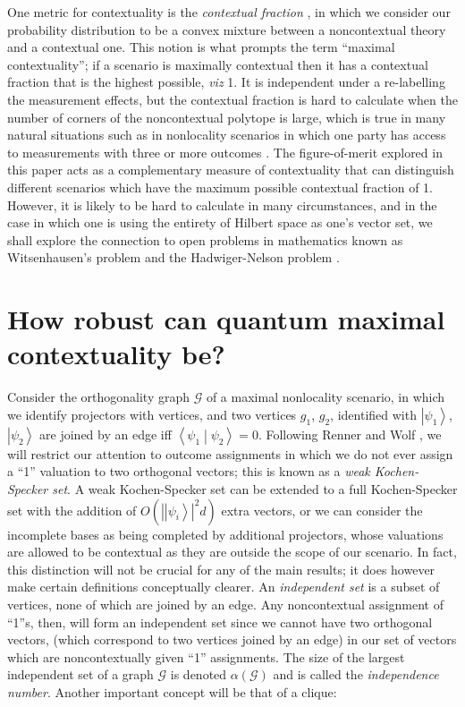 \documentclass{amsart}
\theoremstyle{definition}
\newcommand{\ket}[1]{{\left\vert{#1}\right\rangle}}
\newcommand{\braket}[2]{{\left< {#1} \middle\vert {#2}\right>}}
\begin{document}
One metric for contextuality is the \emph{contextual fraction} \cite{Abra2017}, in which we consider our probability distribution to be a convex mixture between a noncontextual theory and a contextual one. This notion is what prompts the term ``maximal contextuality''; if a scenario is maximally contextual then it has a contextual fraction that is the highest possible, \emph{viz} 1. It is independent under a  re-labelling the measurement effects, but the contextual fraction is hard to calculate when the number of corners of the noncontextual polytope is large, which is true in many natural situations such as in nonlocality scenarios in which one party has access to measurements with three or more outcomes \cite{SimmCC}. The figure-of-merit explored in this paper acts as a complementary measure of contextuality that can distinguish different scenarios which have the maximum possible contextual fraction of 1. However, it is likely to be hard to calculate in many circumstances, and in the case in which one is using the entirety of Hilbert space as one's vector set, we shall explore the connection to open problems in mathematics known as Witsenhausen's problem \cite{Wits1974} and the Hadwiger-Nelson problem \cite{Soif2008}.




\section{How robust can quantum maximal contextuality be?}\label{sec:main}

Consider the orthogonality graph $\mathcal{G}$ of a maximal nonlocality scenario, in which we identify projectors with vertices, and two vertices $g_1$, $g_2$, identified with $\ket{\psi_1}$, $\ket{\psi_2}$ are joined by an edge iff $\braket{\psi_1}{\psi_2}=0$. Following Renner and Wolf \cite{Renn2004}, we will restrict our attention to outcome assignments in which we do not ever assign a ``1'' valuation to two orthogonal vectors; this is known as a \emph{weak Kochen-Specker set}. A weak Kochen-Specker set can be extended to a full Kochen-Specker set with the addition of $O(|\ket{\psi_i}|^2d)$ extra vectors, or we can consider the incomplete bases as being completed by additional projectors, whose valuations are allowed to be contextual as they are outside the scope of our scenario. In fact, this distinction will not be crucial for any of the main results; it does however make certain definitions conceptually clearer. An \emph{independent set} is a subset of vertices, none of which are joined by an edge. Any noncontextual assignment of ``1''s, then, will form an independent set since we cannot have two orthogonal vectors, (which correspond to two vertices joined by an edge) in our set of vectors which are noncontextually given ``1'' assignments. The size of the largest independent set of a graph $\mathcal{G}$ is denoted $\alpha(\mathcal{G})$ and is called the \emph{independence number}. Another important concept will be that of a clique:%
\end{document}
